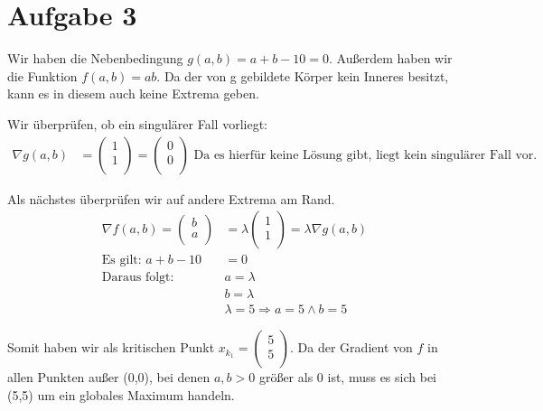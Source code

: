 \documentclass[10pt,a4paper,parskip=half]{scrartcl}
\newcommand{\vectwo}[2]{\begin{pmatrix}#1\\#2\\\end {pmatrix}}
\begin{document}
\section*{Aufgabe 3}
Wir haben die Nebenbedingung $g(a,b) = a + b -10 = 0$. Außerdem haben wir die Funktion $f(a,b) = ab$. Da der von g gebildete Körper kein Inneres besitzt, kann es in diesem auch keine Extrema geben.

Wir überprüfen, ob ein singulärer Fall vorliegt: 
\begin{align*}
\nabla g(a,b) &= \vectwo{1}{1} = \vectwo{0}{0} \text{ Da es hierfür keine Lösung gibt, liegt kein singulärer Fall vor.}
\end{align*}

Als nächstes überprüfen wir auf andere Extrema am Rand.
\begin{align*}
\nabla f(a,b) = \vectwo{b}{a} &= \lambda \vectwo{1}{1} = \lambda \nabla g(a,b) \\
\text{Es gilt: } a + b - 10 &= 0 \\
\text{Daraus folgt: }& a = \lambda \\
& b = \lambda \\
& \lambda = 5 \Rightarrow a = 5 \land b = 5
\end{align*}


Somit haben wir als kritischen Punkt $x_{k_1} = \vectwo{5}{5}$.
Da der Gradient von $f$ in allen Punkten außer (0,0), bei denen $a,b > 0$ größer als 0 ist, muss es sich bei (5,5) um ein globales Maximum handeln. 
\end{document}
